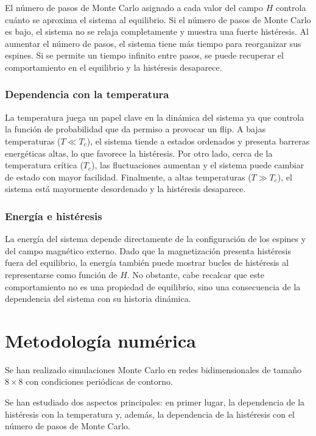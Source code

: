\documentclass[12pt]{article}
\begin{document}
El número de pasos de Monte Carlo asignado a cada valor del campo $H$ controla cuánto se aproxima el sistema al equilibrio. Si el número de pasos de Monte Carlo es bajo, el sistema no se relaja completamente y muestra una fuerte histéresis. Al aumentar el número de pasos, el sistema tiene más tiempo para reorganizar sus espines. Si se permite un tiempo infinito entre pasos, se puede recuperar el comportamiento en el equilibrio y la histéresis desaparece.

\subsubsection{Dependencia con la temperatura}

La temperatura juega un papel clave en la dinámica del sistema ya que controla la función de probabilidad que da permiso a provocar un flip. A bajas temperaturas ($T \ll T_c$), el sistema tiende a estados ordenados y presenta barreras energéticas altas, lo que favorece la histéresis. Por otro lado, cerca de la temperatura crítica ($T_c$), las fluctuaciones aumentan y el sistema puede cambiar de estado con mayor facilidad. Finalmente, a altas temperaturas ($T \gg T_c$), el sistema está mayormente desordenado y la histéresis desaparece.

\subsubsection{Energía e histéresis}

La energía del sistema depende directamente de la configuración de los espines y del campo magnético externo. Dado que la magnetización presenta histéresis fuera del equilibrio, la energía también puede mostrar bucles de histéresis al representarse como función de $H$. No obstante, cabe recalcar que este comportamiento no es una propiedad de equilibrio, sino una consecuencia de la dependencia del sistema con su historia dinámica.

\section{Metodología numérica}

Se han realizado simulaciones Monte Carlo en redes bidimensionales de tamaño $8 \times 8$ con condiciones periódicas de contorno.

Se han estudiado dos aspectos principales: en primer lugar, la dependencia de la histéresis con la temperatura y, además, la dependencia de la histéresis con el número de pasos de Monte Carlo.
\end{document}
